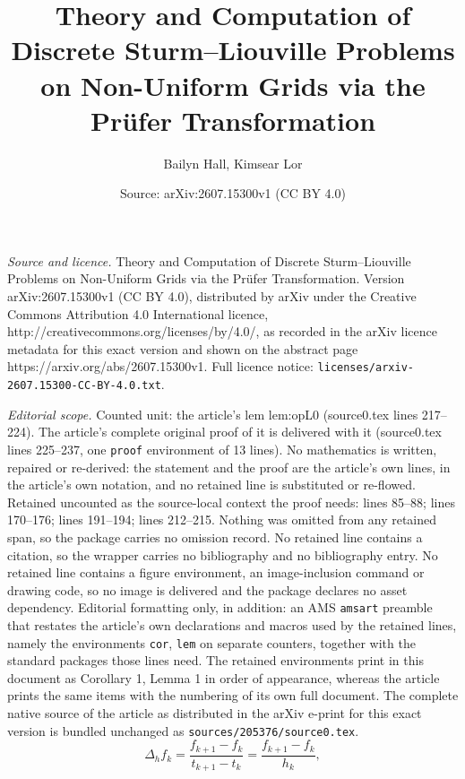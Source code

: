 \documentclass[10pt,a4paper]{amsart}
\title{Theory and Computation of Discrete Sturm--Liouville Problems on Non-Uniform Grids via the Pr\"ufer Transformation}
\author{Bailyn Hall, Kimsear Lor}
\date{Source: arXiv:2607.15300v1 (CC BY 4.0)}
\begin{document}
\maketitle

\noindent\emph{Source and licence.} Theory and Computation of Discrete Sturm--Liouville Problems on Non-Uniform Grids via the Pr\"ufer Transformation. Version arXiv:2607.15300v1 (CC BY 4.0), distributed by arXiv under the Creative Commons Attribution 4.0 International licence, http://creativecommons.org/licenses/by/4.0/, as recorded in the arXiv licence metadata for this exact version and shown on the abstract page https://arxiv.org/abs/2607.15300v1. Full licence notice: \texttt{licenses/arxiv-2607.15300-CC-BY-4.0.txt}.\par\smallskip

\noindent\textit{Editorial scope.} Counted unit: the article's lem lem:opL0 (source0.tex lines 217--224). The article's complete original proof of it is delivered with it (source0.tex lines 225--237, one \texttt{proof} environment of 13 lines). No mathematics is written, repaired or re-derived: the statement and the proof are the article's own lines, in the article's own notation, and no retained line is substituted or re-flowed.  Retained uncounted as the source-local context the proof needs: lines 85--88; lines 170--176; lines 191--194; lines 212--215.  Nothing was omitted from any retained span, so the package carries no omission record.  No retained line contains a citation, so the wrapper carries no bibliography and no bibliography entry.  No retained line contains a figure environment, an image-inclusion command or drawing code, so no image is delivered and the package declares no asset dependency.  Editorial formatting only, in addition: an AMS \texttt{amsart} preamble that restates the article's own declarations and macros used by the retained lines, namely the environments \texttt{cor}, \texttt{lem} on separate counters, together with the standard packages those lines need.  The retained environments print in this document as Corollary 1, Lemma 1 in order of appearance, whereas the article prints the same items with the numbering of its own full document.  The complete native source of the article as distributed in the arXiv e-print for this exact version is bundled unchanged as \texttt{sources/205376/source0.tex}.
\begin{equation}
\label{def:2.2}
\Delta_h f_k = \frac{f_{k+1} - f_k}{t_{k+1} - t_k} = \frac{f_{k+1} - f_k}{h_k},    
\end{equation}
\end{document}
